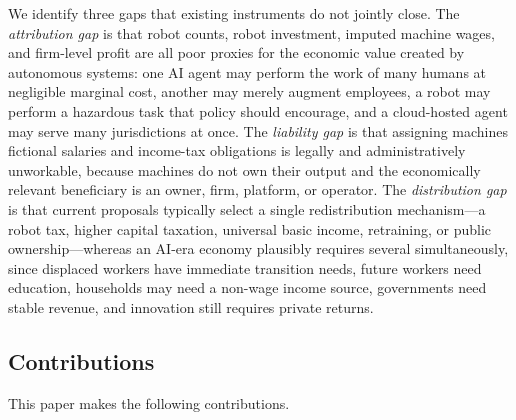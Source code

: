 \documentclass[journal]{IEEEtran}
\theoremstyle{plain}
\theoremstyle{definition}
\begin{document}
We identify three gaps that existing instruments do not jointly close. The \emph{attribution gap} is that robot counts, robot investment, imputed machine wages, and firm-level profit are all poor proxies for the economic value created by autonomous systems: one AI agent may perform the work of many humans at negligible marginal cost, another may merely augment employees, a robot may perform a hazardous task that policy should encourage, and a cloud-hosted agent may serve many jurisdictions at once. The \emph{liability gap} is that assigning machines fictional salaries and income-tax obligations is legally and administratively unworkable, because machines do not own their output and the economically relevant beneficiary is an owner, firm, platform, or operator. The \emph{distribution gap} is that current proposals typically select a single redistribution mechanism---a robot tax, higher capital taxation, universal basic income, retraining, or public ownership---whereas an AI-era economy plausibly requires several simultaneously, since displaced workers have immediate transition needs, future workers need education, households may need a non-wage income source, governments need stable revenue, and innovation still requires private returns.

\subsection{Contributions}

This paper makes the following contributions.
\end{document}
